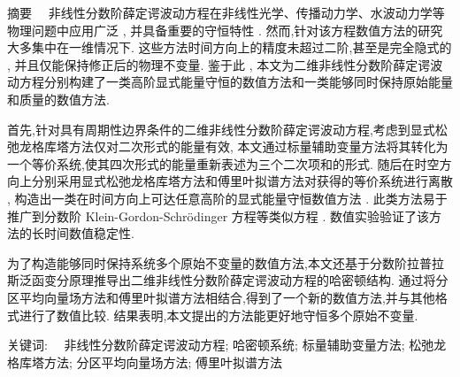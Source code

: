 
\begin{ChineseAbstract}[教授]%
\item {\heiti 摘要\ \ }
非线性分数阶薛定谔波动方程在非线性光学、传播动力学、水波动力学等物理问题中应用广泛 , 并具备重要的守恒特性 . 
然而,针对该方程数值方法的研究大多集中在一维情况下. 这些方法时间方向上的精度未超过二阶,甚至是完全隐式的 , 并且仅能保持修正后的物理不变量.
鉴于此 , 本文为二维非线性分数阶薛定谔波动方程分别构建了一类高阶显式能量守恒的数值方法和一类能够同时保持原始能量和质量的数值方法.  

首先,针对具有周期性边界条件的二维非线性分数阶薛定谔波动方程,考虑到显式松弛龙格库塔方法仅对二次形式的能量有效,
本文通过标量辅助变量方法将其转化为一个等价系统,使其四次形式的能量重新表述为三个二次项和的形式.
随后在时空方向上分别采用显式松弛龙格库塔方法和傅里叶拟谱方法对获得的等价系统进行离散 , 
构造出一类在时间方向上可达任意高阶的显式能量守恒数值方法 . 
此类方法易于推广到分数阶 Klein-Gordon-Schr{\"o}dinger 方程等类似方程 .
数值实验验证了该方法的长时间数值稳定性.

为了构造能够同时保持系统多个原始不变量的数值方法,本文还基于分数阶拉普拉斯泛函变分原理推导出二维非线性分数阶薛定谔波动方程的哈密顿结构.
通过将分区平均向量场方法和傅里叶拟谱方法相结合,得到了一个新的数值方法,并与其他格式进行了数值比较.
结果表明,本文提出的方法能更好地守恒多个原始不变量.

\item {\heiti 关键词:\ \ } 非线性分数阶薛定谔波动方程; 哈密顿系统; 标量辅助变量方法; 松弛龙格库塔方法; 分区平均向量场方法; 傅里叶拟谱方法
\end{ChineseAbstract}
